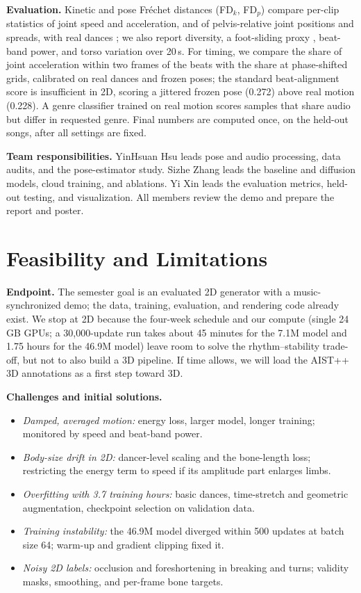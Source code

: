\documentclass[conference,letterpaper]{IEEEtran}
\begin{document}
\textbf{Evaluation.} Kinetic and pose Fr\'echet distances (FD$_k$, FD$_p$) compare per-clip statistics of joint speed and acceleration, and of pelvis-relative joint positions and spreads, with real dances \cite{li2021}; we also report diversity, a foot-sliding proxy \cite{tseng2023}, beat-band power, and torso variation over 20\,s. For timing, we compare the share of joint acceleration within two frames of the beats with the share at phase-shifted grids, calibrated on real dances and frozen poses; the standard beat-alignment score is insufficient in 2D, scoring a jittered frozen pose (0.272) above real motion (0.228). A genre classifier trained on real motion scores samples that share audio but differ in requested genre. Final numbers are computed once, on the held-out songs, after all settings are fixed.

\textbf{Team responsibilities.} YinHsuan Hsu leads pose and audio processing, data audits, and the pose-estimator study. Sizhe Zhang leads the baseline and diffusion models, cloud training, and ablations. Yi Xin leads the evaluation metrics, held-out testing, and visualization. All members review the demo and prepare the report and poster.

\section{Feasibility and Limitations}
\textbf{Endpoint.} The semester goal is an evaluated 2D generator with a music-synchronized demo; the data, training, evaluation, and rendering code already exist. We stop at 2D because the four-week schedule and our compute (single 24\,GB GPUs; a 30,000-update run takes about 45 minutes for the 7.1M model and 1.75 hours for the 46.9M model) leave room to solve the rhythm--stability trade-off, but not to also build a 3D pipeline. If time allows, we will load the AIST++ 3D annotations \cite{li2021} as a first step toward 3D.

\textbf{Challenges and initial solutions.}
\begin{itemize}
\item \emph{Damped, averaged motion:} energy loss, larger model, longer training; monitored by speed and beat-band power.
\item \emph{Body-size drift in 2D:} dancer-level scaling and the bone-length loss; restricting the energy term to speed if its amplitude part enlarges limbs.
\item \emph{Overfitting with 3.7 training hours:} basic dances, time-stretch and geometric augmentation, checkpoint selection on validation data.
\item \emph{Training instability:} the 46.9M model diverged within 500 updates at batch size 64; warm-up and gradient clipping fixed it.
\item \emph{Noisy 2D labels:} occlusion and foreshortening in breaking and turns; validity masks, smoothing, and per-frame bone targets.
\end{itemize}
\end{document}
